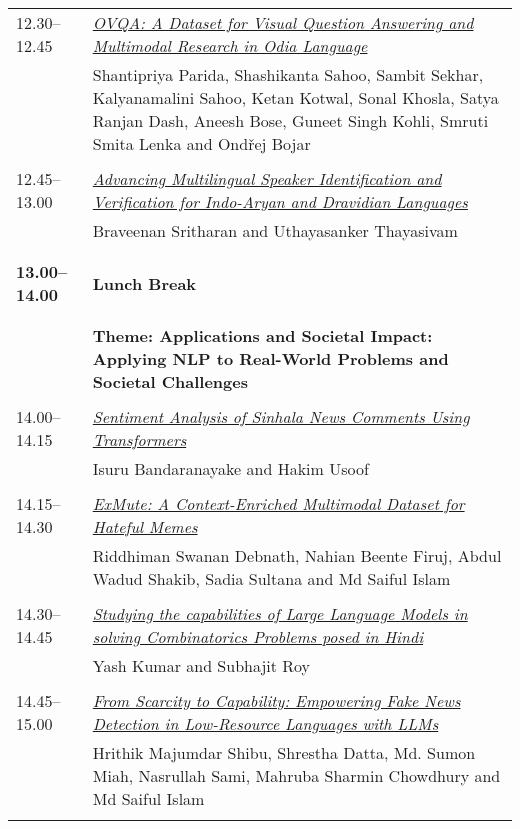 \begin{tabular}{p{20mm}p{128mm}}
\\
12.30--12.45 & \hyperlink{page.85}{\em OVQA: A Dataset for Visual Question Answering and Multimodal Research in Odia Language}\\
         & Shantipriya Parida, Shashikanta Sahoo, Sambit Sekhar, Kalyanamalini Sahoo, Ketan Kotwal, Sonal Khosla, Satya Ranjan Dash, Aneesh Bose, Guneet Singh Kohli, Smruti Smita Lenka and Ondřej Bojar \\
\\

12.45--13.00 & \hyperlink{page.93}{\em Advancing Multilingual Speaker Identification and Verification for Indo-Aryan and Dravidian Languages}\\
         & Braveenan Sritharan and Uthayasanker Thayasivam \\
\\

\\{\bf 13.00--14.00} & {\bf Lunch Break} \\
\\
\\ & {\bf Theme: Applications and Societal Impact: Applying NLP to Real-World Problems and Societal Challenges} \\
\\
14.00--14.15 & \hyperlink{page.100}{\em Sentiment Analysis of Sinhala News Comments Using Transformers}\\
         & Isuru Bandaranayake and Hakim Usoof \\
\\

14.15--14.30 & \hyperlink{page.109}{\em ExMute: A Context-Enriched Multimodal Dataset for Hateful Memes}\\
         & Riddhiman Swanan Debnath, Nahian Beente Firuj, Abdul Wadud Shakib, Sadia Sultana and Md Saiful Islam \\
\\

14.30--14.45 & \hyperlink{page.116}{\em Studying the capabilities of Large Language Models in solving Combinatorics Problems posed in Hindi}\\
         & Yash Kumar and Subhajit Roy \\
\\

14.45--15.00 & \hyperlink{page.126}{\em From Scarcity to Capability: Empowering Fake News Detection in Low-Resource Languages with LLMs}\\
         & Hrithik Majumdar Shibu, Shrestha Datta, Md. Sumon Miah, Nasrullah Sami, Mahruba Sharmin Chowdhury and Md Saiful Islam \\
\\


\end{tabular}
